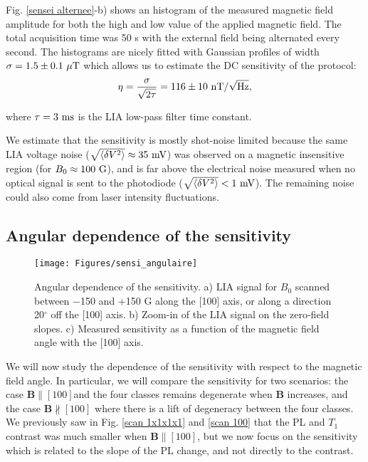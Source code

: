 \documentclass[a4paper,11pt]{report}
\begin{document}
Fig. \ref{sensei alternee}-b) shows an histogram of the measured magnetic field amplitude for both the high and low value of the applied magnetic field. The total acquisition time was 50 s with the external field being alternated every second. The histograms are nicely fitted with Gaussian profiles of width $\sigma=1.5\pm 0.1\ \rm{\mu T}$ which allows us to estimate the DC sensitivity of the protocol:
\begin{equation}
\eta = \frac{\sigma}{\sqrt{2 \tau}}= 116 \pm 10\ \rm{nT} / \sqrt{\rm Hz},
\end{equation}

where $\tau=3\ \rm ms$ is the LIA low-pass filter time constant. 

We estimate that the sensitivity is mostly shot-noise limited because the same LIA voltage noise ($\sqrt{\langle \delta V^2 \rangle} \approx 35\ \rm mV$) was observed on a magnetic insensitive region (for $B_0 \approx 100\ \rm G$), and is far above the electrical noise measured when no optical signal is sent to the photodiode ($\sqrt{\langle \delta V^2 \rangle} < 1\ \rm mV$). The remaining noise could also come from laser intensity fluctuations.

\subsection{Angular dependence of the sensitivity}
\label{sec angular sensi}
\begin{figure}[h!]
\centering
\texttt{[image: Figures/sensi\_angulaire]}
\caption{Angular dependence of the sensitivity. a) LIA signal for $B_0$ scanned between $-$150 and +150 G along the [100] axis, or along a direction 20$^\circ$ off the [100] axis. b) Zoom-in of the LIA signal on the zero-field slopes. c) Measured sensitivity as a function of the magnetic field angle with the [100] axis.}
\label{angular sensi}
\end{figure}

We will now study the dependence of the sensitivity with respect to the magnetic field angle. In particular, we will compare the sensitivity for two scenarios: the case $\mathbf{B}\parallel [100]$and the four classes remains degenerate when $\mathbf{B}$ increases, and the case $\mathbf{B}\nparallel [100]$ where there is a lift of degeneracy between the four classes. We previously saw in Fig. \ref{scan 1x1x1x1} and \ref{scan 100} that the PL and $T_1$ contrast was much smaller when $\mathbf{B}\parallel [100]$, but we now focus on the sensitivity which is related to the slope of the PL change, and not directly to the contrast.
\end{document}
